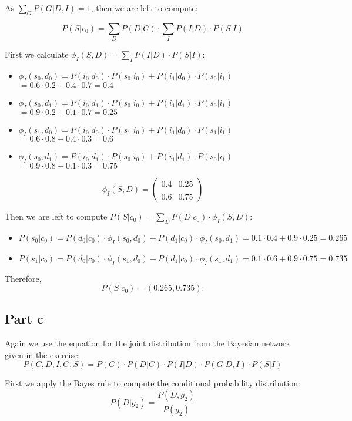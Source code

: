 \documentclass[11pt,a4paper]{article}
\begin{document}
	As $ \sum_{G}P(G|D,I) = 1$, then we are left to compute:
	
	$$ P(S|c_0) = \sum_{D} P(D|C) \cdot  \sum_{I}P(I|D)\cdot P(S|I)$$
	
	First we calculate $ \phi_I(S,D) = \sum_{I}P(I|D)\cdot P(S|I)$:
	\begin{itemize}
		\item $ \phi_I(s_0, d_0) = P(i_0|d_0) \cdot  P(s_0|i_0) + P(i_1|d_0) \cdot  P(s_0|i_1) $
		$ = 0.6\cdot 0.2 + 0.4\cdot 0.7 = 0.4 $
		\item $ \phi_I(s_0, d_1) = P(i_0|d_1) \cdot  P(s_0|i_0) + P(i_1|d_1) \cdot  P(s_0|i_1) $
		$ = 0.9\cdot 0.2 + 0.1\cdot 0.7 = 0.25 $
		\item $ \phi_I(s_1, d_0) = P(i_0|d_0) \cdot  P(s_1|i_0) + P(i_1|d_0) \cdot P(s_1|i_1) $
		$ = 0.6\cdot 0.8 + 0.4\cdot 0.3 = 0.6 $
		\item $ \phi_I(s_0,d_1) = P(i_0|d_1) \cdot  P(s_0|i_0) + P(i_1|d_1) \cdot P(s_0|i_1) $
		$ = 0.9\cdot 0.8 + 0.1\cdot 0.3 = 0.75 $
	\end{itemize}
	
	$$  \phi_I(S,D) =  \left(\begin{smallmatrix} 0.4 & 0.25 \\ \\ 0.6 & 0.75 \end{smallmatrix} \right) $$
	
	Then we are left to compute $ P(S|c_0) = \sum_{D}P(D|c_0) \cdot  \phi_I(S,D) :$
	\begin{itemize}
		\item $ P(s_0|c_0) = P(d_0|c_0)\cdot \phi_I(s_0,d_0) + P(d_1|c_0)\cdot \phi_I(s_0,d_1) = 0.1\cdot 0.4 + 0.9\cdot 0.25 = 0.265 $
		\item $ P(s_1|c_0) = P(d_0|c_0)\cdot \phi_I(s_1,d_0) + P(d_1|c_0)\cdot \phi_I(s_1,d_1)  = 0.1\cdot 0.6 + 0.9\cdot 0.75  = 0.735 $
	\end{itemize}
	
	Therefore, $$ P(S | c_0) = (0.265, 0.735). $$
	
	\subsection*{Part c}
	Again we use the equation for the joint distribution from the Bayesian network given in the exercise:
	$$ P(C,D,I,G,S) = P(C)\cdot P(D|C)\cdot P(I|D)\cdot P(G|D,I)\cdot P(S|I) $$
	
	First we apply the Bayes rule to compute the conditional probability distribution:
	 $$ P(D | g_2) = \frac{P(D, g_2)}{P(g_2)} $$
	 
\end{document}
